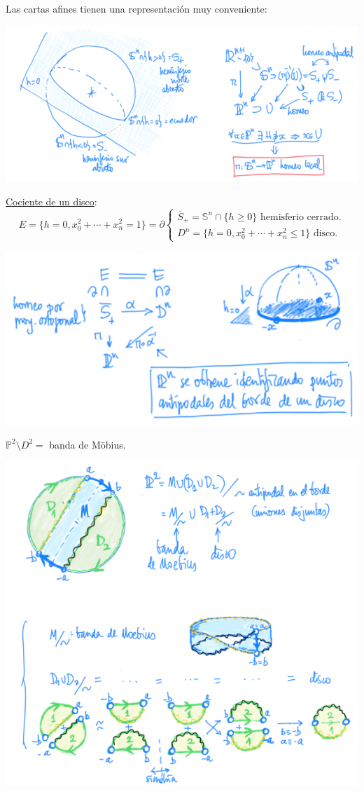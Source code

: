 Las cartas afines tienen una representación muy conveniente:
\begin{center}
    \includegraphics[scale=0.3]{images/repr_carta_afin} 
\end{center}

\underline{Cociente de un disco}:
\[
E = \{h = 0, x_0^2 + \cdots + x_n^2 = 1\} = \partial \begin{cases}
    \overline{S}_+ = \mathbb{S}^n \cap \{h \ge 0\} \text{ hemisferio cerrado.} \\
    D^n = \{h = 0, x_0^2 + \cdots + x_n^2 \le 1\} \text{ disco.} 
\end{cases} 
\]
\begin{center}
    \includegraphics[scale=0.3]{images/cociente_disco} 
\end{center}

\begin{ej}
$\mathbb{P}^{2} \setminus D^2 = $ banda de Möbius.
\begin{center}
    \includegraphics[scale=0.3]{images/banda_moebius} 
\end{center}
\end{ej}

